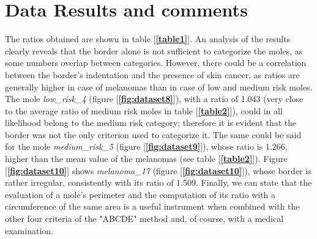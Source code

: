 \documentclass[12pt]{report}
\begin{document}
\section{Data Results and comments}
The ratios obtained are shown in table [\textbf{\ref{table1}}]. An analysis of the results clearly reveals that the border alone is not sufficient to categorize the moles, as some numbers overlap between categories. However, there could be a correlation between the border’s indentation and the presence of skin cancer, as ratios are generally higher in case of melanomas than in case of low and medium risk moles. The mole \textit{low\_risk\_4} (figure [\textbf{\ref{fig:dataset8}}]), with a ratio of 1.043 (very close to the average ratio of medium risk moles in table [\textbf{\ref{table2}}]), could in all likelihood belong to the medium risk category; therefore it is evident that the border was not the only criterion used to categorize it. The same could be said for the mole \textit{medium\_risk\_5} (figure [\textbf{\ref{fig:dataset9}}]), whose ratio is 1.266, higher than the mean value of the melanomas (see table [\textbf{\ref{table2}}]). Figure [\textbf{\ref{fig:dataset10}}] shows \textit{melanoma\_17} (figure [\textbf{\ref{fig:dataset10}}]), whose border is rather irregular, consistently with its ratio of 1.509.
Finally, we can state that the evaluation of a mole’s perimeter and the computation of its ratio with a circumference of the same area is a useful instrument when combined with the other four criteria of the "ABCDE" method and, of course, with a medical examination.
\end{document}
